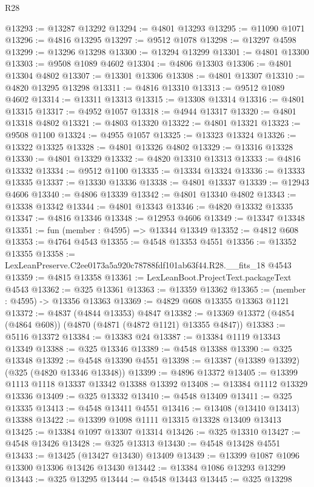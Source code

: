 \begin{lexlean}{R28}
\begin{coremodule}
@13293 := @13287 @13292
@13294 := @4801 @13293
@13295 := @11090 @1071
@13296 := @4816 @13295
@13297 := @9512 @1078
@13298 := @13297 @4598
@13299 := @13296 @13298
@13300 := @13294 @13299
@13301 := @4801 @13300
@13303 := @9508 @1089 @4602
@13304 := @4806 @13303
@13306 := @4801 @13304 @4802
@13307 := @13301 @13306
@13308 := @4801 @13307
@13310 := @4820 @13295 @13298
@13311 := @4816 @13310
@13313 := @9512 @1089 @4602
@13314 := @13311 @13313
@13315 := @13308 @13314
@13316 := @4801 @13315
@13317 := @4952 @1057
@13318 := @4944 @13317
@13320 := @4801 @13318 @4802
@13321 := @4803 @13320
@13322 := @4801 @13321
@13323 := @9508 @1100
@13324 := @4955 @1057
@13325 := @13323 @13324
@13326 := @13322 @13325
@13328 := @4801 @13326 @4802
@13329 := @13316 @13328
@13330 := @4801 @13329
@13332 := @4820 @13310 @13313
@13333 := @4816 @13332
@13334 := @9512 @1100
@13335 := @13334 @13324
@13336 := @13333 @13335
@13337 := @13330 @13336
@13338 := @4801 @13337
@13339 := @12943 @4606
@13340 := @4806 @13339
@13342 := @4801 @13340 @4802
@13343 := @13338 @13342
@13344 := @4801 @13343
@13346 := @4820 @13332 @13335
@13347 := @4816 @13346
@13348 := @12953 @4606
@13349 := @13347 @13348
@13351 := fun (member : @4595) => @13344 @13349
@13352 := @4812 @608
@13353 := @4764 @4543
@13355 := @4548 @13353 @4551
@13356 := @13352 @13355
@13358 := LexLeanPreserve.C2ee0173a5a920c78788fdf101ab63f44.R28.__fits_18 @4543
@13359 := @4815 @13358
@13361 := LexLeanBoot.ProjectText.packageText @4543
@13362 := @325 @13361
@13363 := @13359 @13362
@13365 := (member : @4595) -> @13356 @13363
@13369 := @4829 @608 @13355 @13363 @1121
@13372 := @4837 (@4844 @13353) @4847
@13382 := @13369 @13372 (@4854 (@4864 @608)) (@4870 (@4871 (@4872 @1121) @13355 @4847))
@13383 := @5116 @13372
@13384 := @13383 @24
@13387 := @13384 @1119 @13343 @13349
@13388 := @325 @13346
@13389 := @4548 @13388
@13390 := @325 @13348
@13392 := @4548 @13390 @4551
@13398 := @13387 (@13389 @13392) (@325 (@4820 @13346 @13348))
@13399 := @4896 @13372
@13405 := @13399 @1113 @1118 @13337 @13342 @13388 @13392
@13408 := @13384 @1112 @13329 @13336
@13409 := @325 @13332
@13410 := @4548 @13409
@13411 := @325 @13335
@13413 := @4548 @13411 @4551
@13416 := @13408 (@13410 @13413) @13388
@13422 := @13399 @1098 @1111 @13315 @13328 @13409 @13413
@13425 := @13384 @1097 @13307 @13314
@13426 := @325 @13310
@13427 := @4548 @13426
@13428 := @325 @13313
@13430 := @4548 @13428 @4551
@13433 := @13425 (@13427 @13430) @13409
@13439 := @13399 @1087 @1096 @13300 @13306 @13426 @13430
@13442 := @13384 @1086 @13293 @13299
@13443 := @325 @13295
@13444 := @4548 @13443
@13445 := @325 @13298

\end{coremodule}
\end{lexlean}
